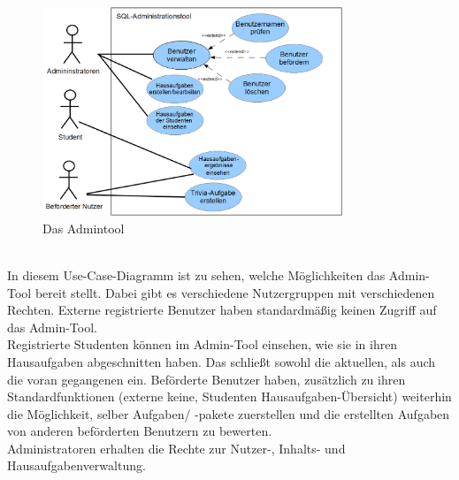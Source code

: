 \begin{figure}[ht]
\centering
\includegraphics[width=0.8\textwidth]{figures/Admintool.PNG}
\caption{Das Admintool}
\end{figure}\\
In diesem Use-Case-Diagramm ist zu sehen, welche Möglichkeiten das Admin-Tool bereit stellt. Dabei gibt es verschiedene Nutzergruppen mit verschiedenen Rechten. 
Externe registrierte Benutzer haben standardmäßig keinen Zugriff auf das Admin-Tool.\\
Registrierte Studenten können im Admin-Tool einsehen, wie sie in ihren Hausaufgaben abgeschnitten haben. Das schließt sowohl die aktuellen, als auch die voran gegangenen ein.
Beförderte Benutzer haben, zusätzlich zu ihren Standardfunktionen (externe keine, Studenten Hausaufgaben-Übersicht) weiterhin die Möglichkeit, selber Aufgaben/ -pakete zuerstellen und die erstellten Aufgaben von anderen beförderten Benutzern zu bewerten.\\
Administratoren erhalten die Rechte zur Nutzer-, Inhalts- und Hausaufgabenverwaltung.  \\\\\\\\\\





